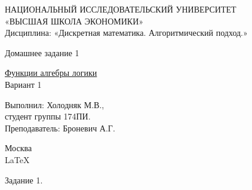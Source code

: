 \documentclass[a4paper,12pt]{report} %
\begin{document}
\begin{titlepage}
	\newpage
	
	\begin{center}
		{\large НАЦИОНАЛЬНЫЙ ИССЛЕДОВАТЕЛЬСКИЙ УНИВЕРСИТЕТ \\
			«ВЫСШАЯ ШКОЛА ЭКОНОМИКИ» 							\\
		Дисциплина: «Дискретная математика. Алгоритмический подход.»}
		
		\vfill %
		
		{\large Домашнее задание 1}
		
		\bigskip
		
		
		{\large \underline{Функции алгебры логики}}\\
		Вариант 1
		
		\vfill
		
		\begin{flushright}
			Выполнил: Холодняк М.В.,\\
			студент группы 174ПИ.\medskip \\
			Преподаватель: Броневич А.Г.
		\end{flushright}
		
		\vfill
		
		Москва \number\year \\
		\LaTeX
		
	\end{center}
\end{titlepage}

\newpage

\begin{center}
	Задание 1.\\
\end{center}
\end{document}
